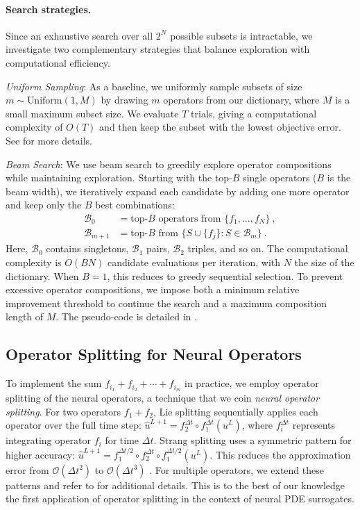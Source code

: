 \documentclass{article}
\newcommand{\jh}[1] {\textcolor{cyan}{[JH. #1]}}
\theoremstyle{plain}
\theoremstyle{definition}
\theoremstyle{remark}
\begin{document}
\paragraph{Search strategies.} 
Since an exhaustive search over all $2^N$ possible subsets is intractable, we investigate two complementary strategies that balance exploration with computational efficiency.

\textit{Uniform Sampling}: As a baseline, we uniformly sample subsets of size $m \sim \text{Uniform}(1, M)$ by drawing $m$ operators from our dictionary, where $M$ is a small maximum subset size. We evaluate $T$ trials, giving a computational complexity of $O(T)$ and then keep the subset with the lowest objective error. See  for more details.

\textit{Beam Search}: We use beam search to greedily explore operator compositions while maintaining exploration. Starting with the top-$B$ single operators ($B$ is the beam width), we iteratively expand each candidate by adding one more operator and keep only the $B$ best combinations:
\begin{align*}
\mathcal{B}_0 &= \text{top-}B \text{ operators from } \{f_1, \ldots, f_N\} ~,
\\
\mathcal{B}_{m+1} &= \text{top-}B \text{ from } \{S \cup \{f_j\} : S \in \mathcal{B}_m\} ~.
\end{align*}
Here, $\mathcal{B}_0$ contains singletons, $\mathcal{B}_1$ pairs, $\mathcal{B}_2$ triples, and so on.
The computational complexity is $O(BN)$ candidate evaluations per iteration, with $N$ the size of the dictionary. When $B=1$, this reduces to greedy sequential selection.
To prevent excessive operator compositions, we impose both a minimum relative improvement threshold to continue the search and a maximum composition length of $M$. The pseudo-code is detailed in .
 

\subsection{Operator Splitting for Neural Operators}
\label{subsec:operator-splitting}

To implement the sum $f_{i_1} + f_{i_2} + \cdots + f_{i_m}$ in practice, we employ operator splitting of the neural operators, a technique that we coin \textit{neural operator splitting}. 
For two operators $f_1 + f_2$, Lie splitting sequentially applies each operator over the full time step: $\hat{u}^{L+1} = f_2^{\Delta t} \circ f_1^{\Delta t}(u^L)$, where $f_i^{\Delta t}$ represents integrating operator $f_i$ for time $\Delta t$. Strang splitting uses a symmetric pattern for higher accuracy: $\hat{u}^{L+1} = f_1^{\Delta t/2} \circ f_2^{\Delta t} \circ f_1^{\Delta t/2}(u^L)$. This reduces the approximation error from $\mathcal{O}(\Delta t^2)$ to $\mathcal{O}(\Delta t^3)$ \citep{Strang1968OnTC, Holden2010SplittingMF}. For multiple operators, we extend these patterns and refer to  for additional details. %
This is to the best of our knowledge the first application of operator splitting in the context of neural PDE surrogates.
\end{document}

